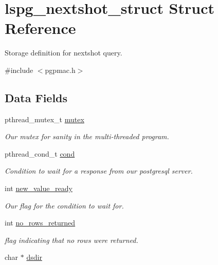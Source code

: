 \hypertarget{structlspg__nextshot__struct}{
\section{lspg\_\-nextshot\_\-struct Struct Reference}
\label{structlspg__nextshot__struct}
}


Storage definition for nextshot query.  


{\ttfamily \#include $<$pgpmac.h$>$}\subsection*{Data Fields}
\begin{DoxyCompactItemize}
\item 
pthread\_\-mutex\_\-t \hyperlink{structlspg__nextshot__struct_a38b657155fbee9b73278f76912cf2333}{mutex}
\begin{DoxyCompactList}\small\item\em Our mutex for sanity in the multi-\/threaded program. \item\end{DoxyCompactList}\item 
pthread\_\-cond\_\-t \hyperlink{structlspg__nextshot__struct_afc773a9eefc173aa98d5c2889e1d7669}{cond}
\begin{DoxyCompactList}\small\item\em Condition to wait for a response from our postgresql server. \item\end{DoxyCompactList}\item 
int \hyperlink{structlspg__nextshot__struct_adb8da14444b98f556dba9420dd4666dc}{new\_\-value\_\-ready}
\begin{DoxyCompactList}\small\item\em Our flag for the condition to wait for. \item\end{DoxyCompactList}\item 
int \hyperlink{structlspg__nextshot__struct_abc9242805729f70b83df79706c394c71}{no\_\-rows\_\-returned}
\begin{DoxyCompactList}\small\item\em flag indicating that no rows were returned. \item\end{DoxyCompactList}\item 
char $\ast$ \hyperlink{structlspg__nextshot__struct_ac372e1774a25b3d4bfbb9169762eb39e}{dsdir}

\end{DoxyCompactItemize}
